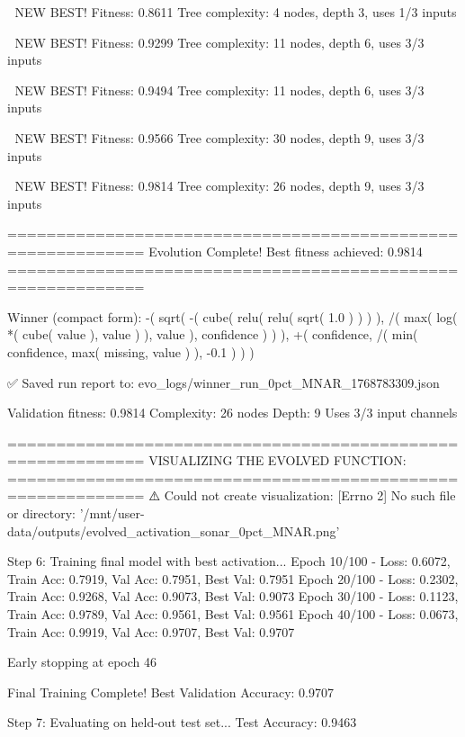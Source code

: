 🎯 NEW BEST! Fitness: 0.8611
Tree complexity: 4 nodes, depth 3, uses 1/3 inputs

🎯 NEW BEST! Fitness: 0.9299
Tree complexity: 11 nodes, depth 6, uses 3/3 inputs

🎯 NEW BEST! Fitness: 0.9494
Tree complexity: 11 nodes, depth 6, uses 3/3 inputs

🎯 NEW BEST! Fitness: 0.9566
Tree complexity: 30 nodes, depth 9, uses 3/3 inputs

🎯 NEW BEST! Fitness: 0.9814
Tree complexity: 26 nodes, depth 9, uses 3/3 inputs

============================================================
Evolution Complete!
Best fitness achieved: 0.9814
============================================================

Winner (compact form):
 -(
  sqrt(
    -(
      cube(
        relu(
          relu(
            sqrt(
              1.0
            )
          )
        )
      ),
      /(
        max(
          log(
            *(
              cube(
                value
              ),
              value
            )
          ),
          value
        ),
        confidence
      )
    )
  ),
  +(
    confidence,
    /(
      min(
        confidence,
        max(
          missing,
          value
        )
      ),
      -0.1
    )
  )
)

✅ Saved run report to: evo_logs/winner_run_0pct_MNAR_1768783309.json

Validation fitness: 0.9814
Complexity: 26 nodes
Depth: 9
Uses 3/3 input channels

============================================================
VISUALIZING THE EVOLVED FUNCTION:
============================================================
⚠️ Could not create visualization: [Errno 2] No such file or directory: '/mnt/user-data/outputs/evolved_activation_sonar_0pct_MNAR.png'

Step 6: Training final model with best activation...
Epoch  10/100 - Loss: 0.6072, Train Acc: 0.7919, Val Acc: 0.7951, Best Val: 0.7951
Epoch  20/100 - Loss: 0.2302, Train Acc: 0.9268, Val Acc: 0.9073, Best Val: 0.9073
Epoch  30/100 - Loss: 0.1123, Train Acc: 0.9789, Val Acc: 0.9561, Best Val: 0.9561
Epoch  40/100 - Loss: 0.0673, Train Acc: 0.9919, Val Acc: 0.9707, Best Val: 0.9707

Early stopping at epoch 46

Final Training Complete!
Best Validation Accuracy: 0.9707

Step 7: Evaluating on held-out test set...
Test Accuracy: 0.9463

